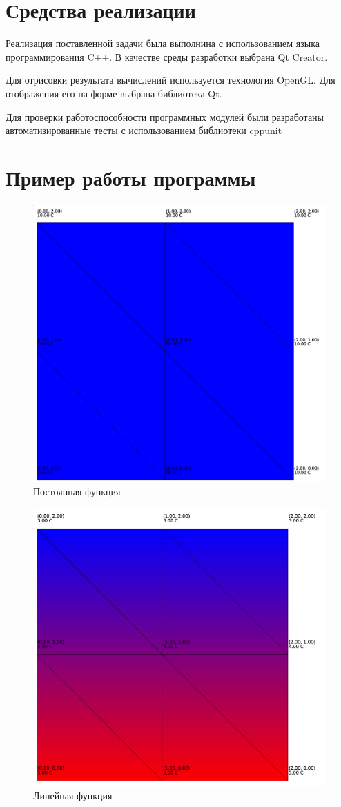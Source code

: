 \documentclass[a4paper, 14pt]{extarticle}
\begin{document}
\clearpage
\section{Средства реализации}

Реализация поставленной задачи была выполнина с использованием языка
программирования C++. В качестве среды разработки выбрана Qt Creator.

Для отрисовки результата вычислений используется технология OpenGL. Для
отображения его на форме выбрана библиотека Qt.

Для проверки работоспособности программных модулей были разработаны
автоматизированные тесты с использованием библиотеки cppunit

\clearpage
\section{Пример работы программы}

\begin{figure}[h]
	\centering
	\includegraphics[width=0.7\linewidth]{images/test1}
	\caption[Рисунок]{Постоянная функция}
\end{figure}

\begin{figure}[h]
	\centering
	\includegraphics[width=0.7\linewidth]{images/test2}
	\caption[Рисунок]{Линейная функция}
\end{figure}
\end{document}
